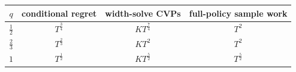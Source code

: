 \begin{center}
\begin{tabular}{@{}cccc@{}}
\toprule
$q$ & conditional regret & width-solve CVPs & full-policy sample work\\
\midrule
$\frac{1}{2}$ & $T^{\frac{3}{4}}$ & $KT^{\frac{7}{4}}$ & $T^{2}$\\
$\frac{2}{3}$ & $T^{\frac{2}{3}}$ & $KT^{2}$ & $T^{2}$\\
$1$ & $T^{\frac{1}{2}}$ & $KT^{\frac{5}{2}}$ & $T^{\frac{5}{2}}$\\
\bottomrule
\end{tabular}
\end{center}
